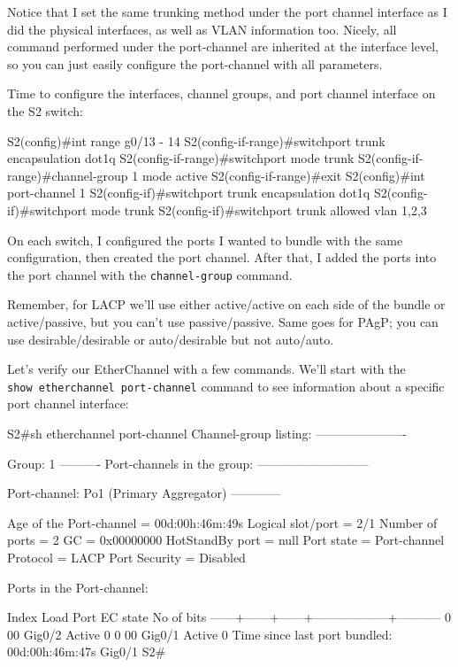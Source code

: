 Notice that I set the same trunking method under the port channel
interface as I did the physical interfaces, as well as VLAN information
too. Nicely, all command performed under the port-channel are inherited
at the interface level, so you can just easily configure the
port-channel with all parameters.

Time to configure the interfaces, channel groups, and port channel interface on the S2 switch:

\begin{cli}
S2(config)#int range g0/13 - 14
S2(config-if-range)#switchport trunk encapsulation dot1q
S2(config-if-range)#switchport mode trunk
S2(config-if-range)#channel-group 1 mode active
S2(config-if-range)#exit
S2(config)#int port-channel 1
S2(config-if)#switchport trunk encapsulation dot1q
S2(config-if)#switchport mode trunk
S2(config-if)#switchport trunk allowed vlan 1,2,3
\end{cli}

On each switch, I configured the ports I wanted to bundle with the same
configuration, then created the port channel. After that, I added the
ports into the port channel with the \texttt{channel-group} command.

Remember, for LACP we'll use either active/active on each side of the
bundle or active/passive, but you can't use passive/passive. Same goes
for PAgP; you can use desirable/desirable or auto/desirable but not
auto/auto.

Let's verify our EtherChannel with a few commands. We'll start with the
\texttt{show\ etherchannel\ port-channel} command to see information
about a specific port channel interface:

\begin{cli}
S2#sh etherchannel port-channel
               Channel-group listing:
                ----------------------
 
Group: 1
----------
                Port-channels in the group:
                ---------------------------
 
Port-channel: Po1    (Primary Aggregator)
------------
 
Age of the Port-channel   = 00d:00h:46m:49s
Logical slot/port   = 2/1       Number of ports = 2
GC                  = 0x00000000      HotStandBy port = null
Port state          = Port-channel
Protocol            =   LACP
Port Security       = Disabled
 
Ports in the Port-channel:
 
Index   Load   Port     EC state        No of bits
------+------+------+------------------+-----------
  0     00     Gig0/2   Active             0
  0     00     Gig0/1   Active             0
Time since last port bundled:    00d:00h:46m:47s    Gig0/1
S2#
\end{cli}

